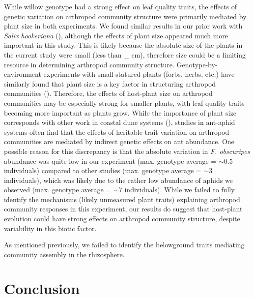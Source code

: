 \documentclass[11pt]{article}
\begin{document}
While willow genotype had a strong effect on leaf quality traits, the effects of genetic variation on arthropod community structure were primarily mediated by plant size in both experiments. We found similar results in our prior work with \textit{Salix hookeriana} (\citealt{Barbour_2015}), although the effects of plant size appeared much more important in this study. This is likely because the absolute size of the plants in the current study were small (less than \_ cm), therefore size could be a limiting resource in determining arthropod community structure. Genotype-by-environment experiments with small-statured plants (forbs, herbs, etc.) have similarly found that plant size is a key factor in structuring arthropod communities (\citealt{Johnson_2005,Crutsinger_2014}). Therefore, the effects of host-plant size on arthropod communities may be especially strong for smaller plants, with leaf quality traits becoming more important as plants grow. While the importance of plant size corresponds with other work in coastal dune systems (\citealt{Crutsinger_2014}), studies in ant-aphid systems often find that the effects of heritable trait variation on arthropod communities are mediated by indirect genetic effects on ant abundance. One possible reason for this discrepancy is that the absolute variation in \textit{F. obscuripes} abundance was quite low in our experiment (max. genotype average = $\sim$0.5 individuals) compared to other studies (max. genotype average = $\sim$3 individuals), which was likely due to the rather low abundance of aphids we observed (max. genotype average = $\sim$7 individuals). While we failed to fully identify the mechanisms (likely unmeasured plant traits) explaining arthropod community responses in this experiment, our results do suggest that host-plant evolution could have strong effects on arthropod community structure, despite variability in this biotic factor. 

As mentioned previously, we failed to identify the belowground traits mediating community assembly in the rhizosphere.

\section*{Conclusion}
\end{document}
